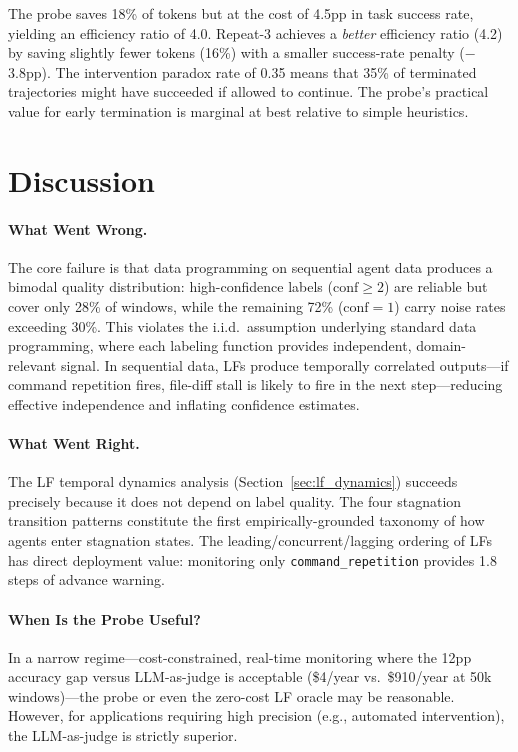 \documentclass[11pt]{article}
\begin{document}
The probe saves 18\% of tokens but at the cost of 4.5pp in task success rate, yielding an efficiency ratio of 4.0.
Repeat-3 achieves a \emph{better} efficiency ratio (4.2) by saving slightly fewer tokens (16\%) with a smaller success-rate penalty ($-$3.8pp).
The intervention paradox rate of 0.35 means that 35\% of terminated trajectories might have succeeded if allowed to continue.
The probe's practical value for early termination is marginal at best relative to simple heuristics.

\section{Discussion}
\label{sec:discussion}

\paragraph{What Went Wrong.}
The core failure is that data programming on sequential agent data produces a bimodal quality distribution: high-confidence labels ($\text{conf}\!\geq\!2$) are reliable but cover only 28\% of windows, while the remaining 72\% ($\text{conf}\!=\!1$) carry noise rates exceeding 30\%.
This violates the i.i.d.\ assumption underlying standard data programming, where each labeling function provides independent, domain-relevant signal.
In sequential data, LFs produce temporally correlated outputs---if command repetition fires, file-diff stall is likely to fire in the next step---reducing effective independence and inflating confidence estimates.

\paragraph{What Went Right.}
The LF temporal dynamics analysis (Section~\ref{sec:lf_dynamics}) succeeds precisely because it does not depend on label quality.
The four stagnation transition patterns constitute the first empirically-grounded taxonomy of how agents enter stagnation states.
The leading/concurrent/lagging ordering of LFs has direct deployment value: monitoring only \texttt{command\_repetition} provides 1.8 steps of advance warning.

\paragraph{When Is the Probe Useful?}
In a narrow regime---cost-constrained, real-time monitoring where the 12pp accuracy gap versus LLM-as-judge is acceptable (\$4/year vs.\ \$910/year at 50k windows)---the probe or even the zero-cost LF oracle may be reasonable.
However, for applications requiring high precision (e.g., automated intervention), the LLM-as-judge is strictly superior.
\end{document}
